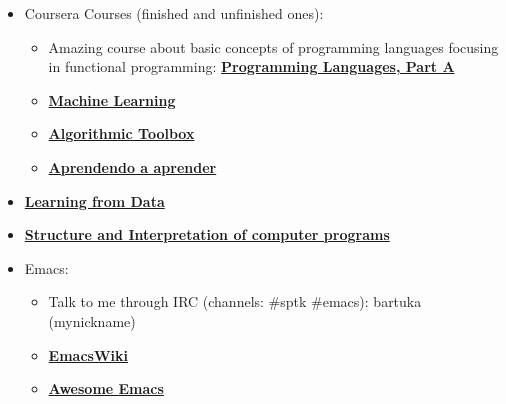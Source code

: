 \documentclass[10pt]{article}
\begin{document}
\begin{itemize}
\item Coursera Courses (finished and unfinished ones):
  \begin{itemize}
  \item Amazing course about basic concepts of programming languages focusing in functional programming:
    \textbf{\href{https://www.coursera.org/learn/programming-languages/home/welcome}{Programming Languages, Part A}}
  \item \textbf{\href{https://www.coursera.org/learn/machine-learning/home/welcome}{Machine Learning}}
  \item \textbf{\href{https://www.coursera.org/learn/algorithmic-toolbox/home/welcome}{Algorithmic Toolbox}}
  \item \textbf{\href{https://www.coursera.org/learn/aprender}{Aprendendo a aprender}}
  \end{itemize}
    \item \textbf{\href{https://courses.edx.org/courses/course-v1:CaltechX+CS_1156x+3T2016/info}{Learning from Data}}
    \item \textbf{\href{https://ocw.mit.edu/courses/electrical-engineering-and-computer-science/6-001-structure-and-interpretation-of-computer-programs-spring-2005/}{Structure and Interpretation of computer programs}}
    \item Emacs:
      \begin{itemize}
      \item Talk to me through IRC (channels: #sptk #emacs): bartuka (mynickname)
      \item \textbf{\href{https://www.emacswiki.org/emacs/EmacsWiki}{EmacsWiki}}
      \item \textbf{\href{https://github.com/emacs-tw/awesome-emacs}{Awesome Emacs}}
      \end{itemize}
\end{itemize}
\end{document}
